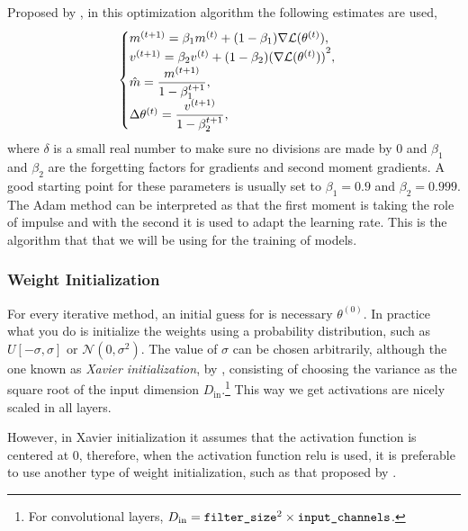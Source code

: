 \begin{itemize}
  Proposed by , in this optimization algorithm the
  following estimates are used,
  \begin{equation}
    \begin{cases}
      m^{(t+1)} = \beta _{1}m^{(t)}
      + (1 - \beta_{1})\nabla\mathcal{L}(\theta^{(t)}), \\
      v^{(t+1)} = \beta_{2}v^{(t)}
      + (1 - \beta _{2}){(\nabla\mathcal{L}(\theta^{(t)}))}^{2}, \\
      \hat{m} = \displaystyle\frac{m^{(t+1)}}{1 - \beta_{1}^{t+1}}, \\
      \Delta\theta^{(t)} = \displaystyle\frac{v^{(t+1)}}{1-\beta _{2}^{t+1}}, \\
    \end{cases}
  \end{equation}
  where \(\delta\) is a small real number to make sure no divisions are made by
  \(0\) and \(\beta_1\) and \(\beta_2\) are the forgetting factors for
  gradients and second moment gradients. A good starting point for these
  parameters is usually set to \(\beta_1 = 0.9\) and \(\beta_2 = 0.999\). The
  Adam method can be interpreted as that the first moment is taking the role of
  impulse and with the second it is used to adapt the learning rate. This is
  the algorithm that that we will be using for the training of models.
\end{itemize}

\subsubsection{Weight Initialization}

For every iterative method, an initial guess for is necessary
\(\theta^{(0)}\). In practice what you do is initialize the weights using a
probability distribution, such as \(U[-\sigma, \sigma]\) or
\(\mathcal{N}(0, \sigma^2)\). The value of \(\sigma\) can be chosen
arbitrarily, although the one known as \emph{Xavier initialization}, by
, consisting of choosing the variance as the square root
of the input dimension \(D_{\text{in}}\).\footnote{For convolutional layers,
  \(D_{\text{in}} = \text{\texttt{filter\_size}}^2 \times
  \text{\texttt{input\_channels}}\).} This way we get activations are nicely
scaled in all layers.

However, in Xavier initialization it assumes that the activation function is
centered at 0, therefore, when the activation function \gls{relu} is used, it
is preferable to use another type of weight initialization, such as that
proposed by .

